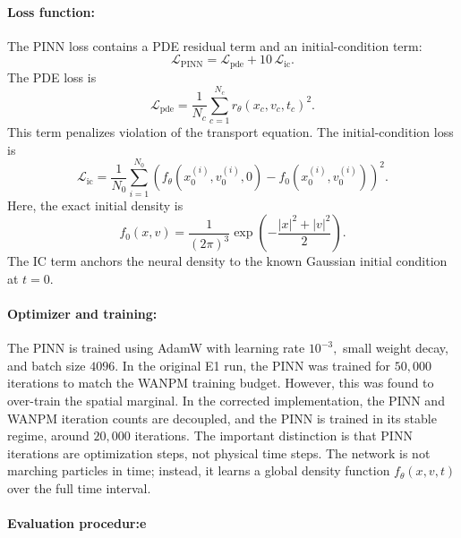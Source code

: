 \documentclass[11pt]{article}
\theoremstyle{plain}
\begin{document}
\paragraph{Loss function:}
\label{subsec:pinn_loss}

The PINN loss contains a PDE residual term and an initial-condition term:
\begin{equation}
\mathcal L_{\mathrm{PINN}}
=
\mathcal L_{\mathrm{pde}}
+
10\,\mathcal L_{\mathrm{ic}}.
\label{eq:pinn_total_loss}
\end{equation}
The PDE loss is
\begin{equation}
\mathcal L_{\mathrm{pde}}
=
\frac{1}{N_c}
\sum_{c=1}^{N_c}
r_\theta(x_c,v_c,t_c)^2.
\label{eq:pinn_pde_loss}
\end{equation}
This term penalizes violation of the transport equation. The initial-condition loss is
\begin{equation}
\mathcal L_{\mathrm{ic}}
=
\frac{1}{N_0}
\sum_{i=1}^{N_0}
\left(
f_\theta(x_0^{(i)},v_0^{(i)},0)
-
f_0(x_0^{(i)},v_0^{(i)})
\right)^2.
\label{eq:pinn_ic_loss}
\end{equation}
Here, the exact initial density is
\begin{equation}
f_0(x,v)
=
\frac{1}{(2\pi)^3}
\exp\left(
-\frac{|x|^2+|v|^2}{2}
\right).
\label{eq:pinn_initial_density}
\end{equation}
The IC term anchors the neural density to the known Gaussian initial condition at \(t=0\).

\paragraph{Optimizer and training:}
\label{subsec:pinn_optimizer}

The PINN is trained using AdamW with learning rate
$
10^{-3},
$
small weight decay, and batch size \(4096\). In the original E1 run, the PINN was trained for \(50{,}000\) iterations to match the WANPM training budget. However, this was found to over-train the spatial marginal. In the corrected implementation, the PINN and WANPM iteration counts are decoupled, and the PINN is trained in its stable regime, around
$
20{,}000
$
iterations. The important distinction is that PINN iterations are optimization steps, not physical time steps. The network is not marching particles in time; instead, it learns a global density function \(f_\theta(x,v,t)\) over the full time interval.

\paragraph{Evaluation procedur:e}
\label{subsec:pinn_evaluation}
\end{document}
